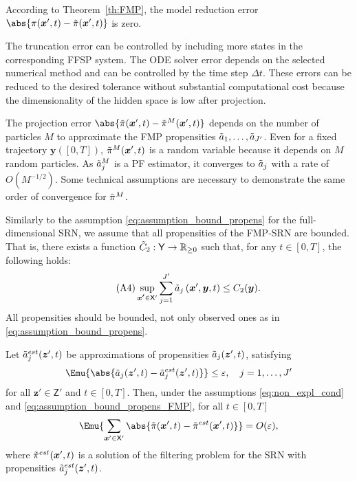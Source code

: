 According to Theorem~\ref{th:FMP}, the model reduction error $\abs{\pi(\boldsymbol{x}',t) - \Tilde{\pi}(\boldsymbol{x}',t)}$ is zero.

The truncation error can be controlled by including more states in the corresponding \ac{FFSP} system. The \ac{ODE} solver error depends on the selected numerical method and can be controlled by the time step $\Delta t$. These errors can be reduced to the desired tolerance without substantial computational cost because the dimensionality of the hidden space is low after projection.

The projection error $\abs{\Tilde{\pi}(\boldsymbol{x}',t) - \Tilde{\pi}^{M} (\boldsymbol{x}', t)}$ depends on the number of particles $M$ to approximate the \ac{FMP} propensities $\Tilde{a}_1, \dots, \Tilde{a}_{J'}$. Even for a fixed trajectory $\boldsymbol{y}([0,T])$,  $\Tilde{\pi}^M(\boldsymbol{x}', t)$ is a random variable because it depends on $M$ random particles. As $\Tilde{a}_j^M$ is a \ac{PF} estimator, it converges to $\Tilde{a}_j$ with a rate of $O(M^{-1/2})$. Some technical assumptions are necessary to demonstrate the same  order of convergence for $\Tilde{\pi}^M$.

Similarly to the assumption \eqref{eq:assumption_bound_propens} for the full-dimensional \ac{SRN}, we assume that all propensities of the \ac{FMP}-\ac{SRN} are bounded. That is, there exists a function $\Tilde{C}_2: \mathsf{Y} \to \mathbb{R}_{\geq 0}$ such that, for any $t \in [0, T]$, the following holds:
\begin{equation}
\label{eq:assumption_bound_propens_FMP} \tag{A4}
    \sup_{\boldsymbol{x'} \in \mathsf{X}'} \sum_{j = 1}^{J'} \Tilde{a}_j \left( \boldsymbol{x}', \boldsymbol{y}, t \right) \leq C_2 (\boldsymbol{y}).
\end{equation}
All propensities should be bounded, not only observed ones as in \eqref{eq:assumption_bound_propens}.

\begin{theorem}
\label{th:sensitivity}
    Let $\Tilde{a}_j^{est}(\boldsymbol{z}', t)$ be approximations of propensities $\Tilde{a}_j(\boldsymbol{z}', t)$, satisfying
    \begin{equation}
        \label{eq:a_tilde_error_eps}
        \Emu{\abs{ \Tilde{a}_j(\boldsymbol{z}', t) - \Tilde{a}_j^{est}(\boldsymbol{z}', t) }} \leq \varepsilon, \quad j = 1, \dots, J'
    \end{equation}
    for all $\boldsymbol{z}' \in \mathsf{Z}'$ and $t \in [0, T]$. 
    Then, under the assumptions \eqref{eq:non_expl_cond} and \eqref{eq:assumption_bound_propens_FMP}, for all $t \in [0, T]$ 
    \begin{equation}
    \label{eq:projection_error_pi_eps}
        \Emu{ \sum_{\boldsymbol{x}' \in \mathsf{X}'} \abs{ \Tilde{\pi}(\boldsymbol{x}', t) - \Tilde{\pi}^{est}(\boldsymbol{x}', t) }} =  O(\varepsilon),
    \end{equation}
    where $\Tilde{\pi}^{est}(\boldsymbol{x}', t)$ is a solution of the filtering problem for the \ac{SRN} with propensities $\Tilde{a}_j^{est}(\boldsymbol{z}', t)$.
\end{theorem}

